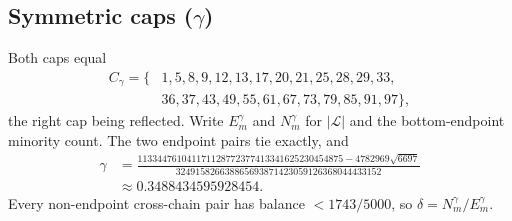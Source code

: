 \documentclass[11pt]{amsart}
\theoremstyle{definition}
\theoremstyle{remark}
\newcommand{\Lin}{\mathcal{L}}
\begin{document}
\subsection*{Symmetric caps ($\gamma$)} Both caps equal
\[
\begin{aligned}C_\gamma=\{&1,5,8,9,12,13,17,20,21,25,28,29,33,\\&36,37,43,49,55,61,67,73,79,85,91,97\},\end{aligned}
\]
the right cap being reflected. Write $E_m^{\gamma}$ and $N_m^{\gamma}$ for $|\Lin|$ and the bottom-endpoint minority count. The two endpoint pairs tie exactly, and
\[
\begin{aligned}\gamma&=\frac{113344761041171128772377413341625230454875-4782969\sqrt{6697}}{324915826638865693871423059126368044433152}\\&\approx0.3488434595928454 .\end{aligned}
\]
Every non-endpoint cross-chain pair has balance $<1743/5000$, so $\delta=N_m^{\gamma}/E_m^{\gamma}$.
\end{document}
